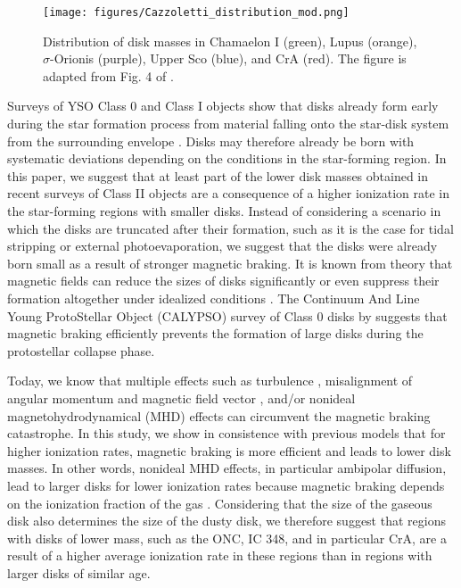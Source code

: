 \documentclass{aa}
\begin{document}
\begin{figure}
        \centering
    \texttt{[image: figures/Cazzoletti\_distribution\_mod.png]}
        \caption{Distribution of disk masses in Chamaelon I (green), Lupus (orange), $\sigma$-Orionis (purple), Upper Sco (blue), and CrA (red). The figure is adapted from Fig. 4 of \cite{Cazzoletti2019}.}
        \label{fig:Cazzoletti}
\end{figure}


Surveys of YSO Class 0 and Class I objects show that disks already form early during the star formation process from material falling onto the star-disk system from the surrounding envelope \citep{Jorgensen2009,Segura-Cox2018,Tychoniec2018,Andersen2019}. Disks may therefore already be born with systematic deviations depending on the conditions in the star-forming region.
In this paper, we suggest that at least part of the lower disk masses obtained in recent surveys of Class II objects are a consequence of a higher ionization rate in the star-forming regions with smaller disks. Instead of considering a scenario in which the disks are truncated after their formation, such as it is the case for tidal stripping or external photoevaporation, we suggest that the disks were already born small as a result of stronger magnetic braking. 
It is known from theory that magnetic fields can reduce the sizes of disks significantly or even suppress their formation altogether under idealized conditions \citep[the so-called magnetic braking catastrophe;][]{LuestSchlueter1955,MestelSpitzer1956,MellonLi2008}. 
The  Continuum And Line Young ProtoStellar Object (CALYPSO) survey of Class 0 disks by \citet{Maury2019} suggests that magnetic braking efficiently prevents the formation of large disks during the protostellar collapse phase. 

Today, we know that multiple effects such as turbulence \citep{Seifried2012,Seifried2013,Joos2013,Kuffmeier2017}, misalignment of angular momentum and magnetic field vector \citep{Joos2012,Krumholz2013,Gray2018}, and/or nonideal magnetohydrodynamical (MHD) effects \citep{MellonLi2009,Machida2011,Machida2011b,Tsukamoto2015b,Masson2016,Wurster2019} can circumvent the magnetic braking catastrophe.
In this study, we show in consistence with previous models \citep{Wurster2018CRIRstudy} that for higher ionization rates, magnetic braking is more efficient and leads to lower disk masses.
In other words, nonideal MHD effects, in particular ambipolar diffusion, lead to larger disks for lower ionization rates because magnetic braking depends on the ionization fraction of the gas \citep{Zhao2016}.
Considering that the size of the gaseous disk also determines the size of the dusty disk, we therefore suggest that regions with disks of lower mass, such as the ONC, IC 348, and in particular CrA, are a result of a higher average ionization rate in these regions than in regions with larger disks of similar age. 
\end{document}
